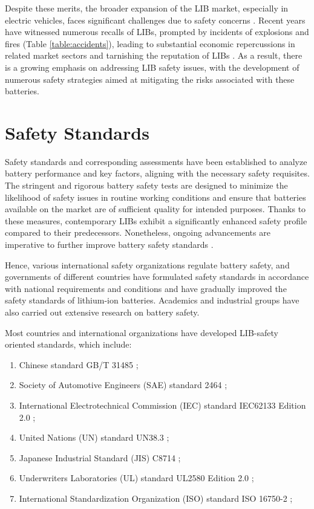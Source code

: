 Despite these merits, the broader expansion of the LIB market, especially in electric vehicles, faces significant challenges due to safety concerns \cite{love2018innovating,schipper2016recent,feng2018thermal}. Recent years have witnessed numerous recalls of LIBs, prompted by incidents of explosions and fires (Table \ref{table:accidents}), leading to substantial economic repercussions in related market sectors and tarnishing the reputation of LIBs \cite{chen2021review,balakrishnan2006safety}. As a result, there is a growing emphasis on addressing LIB safety issues, with the development of numerous safety strategies aimed at mitigating the risks associated with these batteries.

\section{Safety Standards}
\label{sec:safety-standards}

Safety standards and corresponding assessments have been established to analyze battery performance and key factors, aligning with the necessary safety requisites. The stringent and rigorous battery safety tests are designed to minimize the likelihood of safety issues in routine working conditions and ensure that batteries available on the market are of sufficient quality for intended purposes. Thanks to these measures, contemporary LIBs exhibit a significantly enhanced safety profile compared to their predecessors. Nonetheless, ongoing advancements are imperative to further improve battery safety standards \cite{chen2021review}.

Hence, various international safety organizations regulate battery safety, and governments of different countries have formulated safety standards in accordance with national requirements and conditions and have gradually improved the safety standards of lithium-ion batteries. Academics and industrial groups have also carried out extensive research on battery safety.

Most countries and international organizations have developed LIB-safety oriented standards, which include:
\begin{enumerate}
    \item Chinese standard GB/T 31485 \cite{};
    \item Society of Automotive Engineers (SAE) standard 2464 \cite{};
    \item International Electrotechnical Commission (IEC) standard IEC62133 Edition 2.0 \cite{};
    \item United Nations (UN) standard UN38.3 \cite{};
    \item Japanese Industrial Standard (JIS) C8714 \cite{};
    \item Underwriters Laboratories (UL) standard UL2580 Edition 2.0 \cite{};
    \item International Standardization Organization (ISO) standard
    ISO 16750-2 \cite{};
\end{enumerate}

